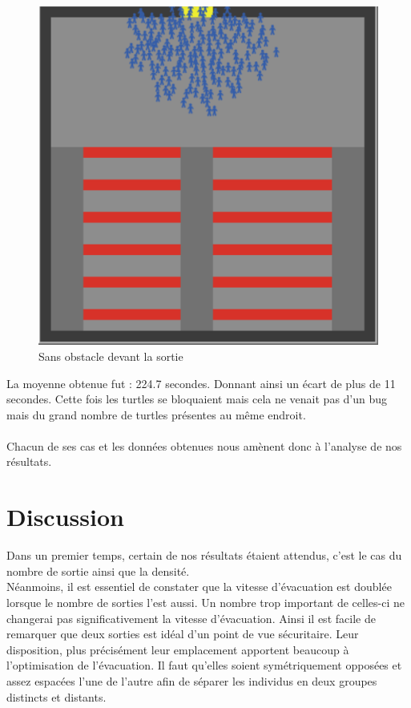 \documentclass{article}
\begin{document}
\begin{figure}[H]
	\includegraphics[scale=0.35]{sansobstacle.PNG}
  \centering
	\caption{Sans obstacle devant la sortie }
 	\label{pic: sans obstacle}
\end{figure}
La moyenne obtenue fut : 224.7 secondes.
Donnant ainsi un écart de plus de 11 secondes. Cette fois les turtles se bloquaient mais cela ne venait pas d'un bug mais du grand nombre de turtles présentes au même endroit. \\\\
Chacun de ses cas et les données obtenues nous amènent donc à l'analyse de nos résultats.

\section{Discussion} 
Dans un premier temps, certain de nos résultats étaient attendus, c'est le cas du nombre de sortie ainsi que la densité. \\

Néanmoins, il est essentiel de constater que la vitesse d'évacuation est doublée lorsque le nombre de sorties l'est aussi. Un nombre trop important de celles-ci ne changerai pas significativement la vitesse d'évacuation. Ainsi il est facile de remarquer que deux sorties est idéal d'un point de vue sécuritaire. Leur disposition, plus précisément leur emplacement apportent beaucoup à l'optimisation de l'évacuation. Il faut qu'elles soient symétriquement opposées et assez espacées l'une de l'autre afin de séparer les individus en deux groupes distincts et distants.\\
\end{document}
